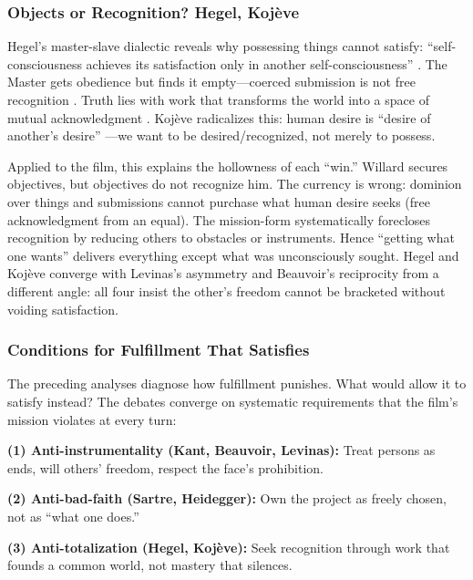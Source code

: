 \subsubsection*{Objects or Recognition? Hegel, Kojève}

Hegel's master-slave dialectic reveals why possessing things cannot satisfy:
``self-consciousness achieves its satisfaction only in another self-consciousness''
\parencite[\S 175]{HegelPhenomenology1977}. The Master gets obedience but finds it empty---coerced
submission is not free recognition \parencite[\S\S 187--189]{HegelPhenomenology1977}. Truth
lies with work that transforms the world into a space of mutual acknowledgment
\parencite[\S 196]{HegelPhenomenology1977}. Koj{\`e}ve radicalizes this: human desire is
``desire of another's desire'' \parencite[p.~6]{KojeveIRH1980}---we want to be desired/recognized,
not merely to possess.

Applied to the film, this explains the hollowness of each ``win.'' Willard secures objectives,
but objectives do not recognize him. The currency is wrong: dominion over things and
submissions cannot purchase what human desire seeks (free acknowledgment from an equal). The
mission-form systematically forecloses recognition by reducing others to obstacles or
instruments. Hence ``getting what one wants'' delivers everything except what was unconsciously
sought. Hegel and Koj{\`e}ve converge with Levinas's asymmetry and Beauvoir's reciprocity from
a different angle: all four insist the other's freedom cannot be bracketed without voiding
satisfaction.

\subsubsection*{Conditions for Fulfillment That Satisfies}

The preceding analyses diagnose how fulfillment punishes. What would allow it to satisfy
instead? The debates converge on systematic requirements that the film's mission violates at
every turn:

\textbf{(1) Anti-instrumentality (Kant, Beauvoir, Levinas):} Treat persons as ends, will
others' freedom, respect the face's prohibition.

\textbf{(2) Anti-bad-faith (Sartre, Heidegger):} Own the project as freely chosen, not as
``what one does.''

\textbf{(3) Anti-totalization (Hegel, Kojève):} Seek recognition through work that founds a
common world, not mastery that silences.

